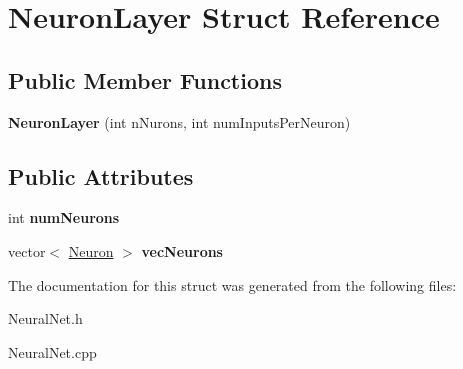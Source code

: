 \hypertarget{struct_neuron_layer}{}\section{Neuron\+Layer Struct Reference}
\label{struct_neuron_layer}
\subsection*{Public Member Functions}
\begin{DoxyCompactItemize}
\item 
\hypertarget{struct_neuron_layer_abd4e017ef1311a09eb0b840e5ebb9c7f}{}\label{struct_neuron_layer_abd4e017ef1311a09eb0b840e5ebb9c7f} 
{\bfseries Neuron\+Layer} (int n\+Nurons, int num\+Inputs\+Per\+Neuron)
\end{DoxyCompactItemize}
\subsection*{Public Attributes}
\begin{DoxyCompactItemize}
\item 
\hypertarget{struct_neuron_layer_a0c1340701dbd67d945f65f68e4e93f9e}{}\label{struct_neuron_layer_a0c1340701dbd67d945f65f68e4e93f9e} 
int {\bfseries num\+Neurons}
\item 
\hypertarget{struct_neuron_layer_aa1dd1b1359dc7ae424f336357db233cd}{}\label{struct_neuron_layer_aa1dd1b1359dc7ae424f336357db233cd} 
vector$<$ \hyperlink{struct_neuron}{Neuron} $>$ {\bfseries vec\+Neurons}
\end{DoxyCompactItemize}


The documentation for this struct was generated from the following files\+:\begin{DoxyCompactItemize}
\item 
Neural\+Net.\+h\item 
Neural\+Net.\+cpp\end{DoxyCompactItemize}
